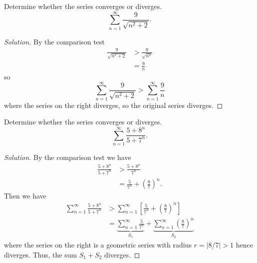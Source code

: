 \begin{problem}[WebAssign HW \# 23, \# 2]
Determine whether the series converges or diverges.
\[
\sum_{n=1}^\infty\frac{9}{\sqrt{n^2+2}}.
\]
\end{problem}
\begin{proof}[Solution]
By the comparison test
\begin{align*}
\frac{9}{\sqrt{n^2+2}}&>\frac{9}{\sqrt{n^2}}\\
                      &=\frac{9}{n}
\end{align*}
so
\[
\sum_{n=1}^\infty\frac{9}{\sqrt{n^2+2}}>\sum_{n=1}^\infty\frac{9}{n}
\]
where the series on the right diverges, so the original series diverges.
\end{proof}

\begin{problem}[WebAssign HW \# 23, \# 3]
Determine whether the series converges or diverges.
\[
\sum_{n=1}^\infty\frac{5+8^n}{5+7^n}.
\]
\end{problem}
\begin{proof}[Solution]
By the comparison test we have
\begin{align*}
\frac{5+8^n}{5+7^n}&>\frac{5+8^n}{7^n}\\
                   &=\frac{5}{7^n}+\left(\frac{8}{7}\right)^n.
\end{align*}
Then we have
\begin{align*}
\sum_{n=1}^\infty\frac{5+8^n}{5+7^n}
&>\sum_{n=1}^\infty\left[\frac{5}{7^n}+\left(\frac{8}{7}\right)^n\right]\\
&=\underbrace{\sum_{n=1}^\infty\frac{5}{7^n}}_{S_1}
+\underbrace{\sum_{n=1}^\infty\left(\frac{8}{7}\right)^n}_{S_2}
\end{align*}
where the series on the right is a geometric series with radius $r=|8/7|>1$
hence diverges. Thus, the sum $S_1+S_2$ diverges.
\end{proof}

